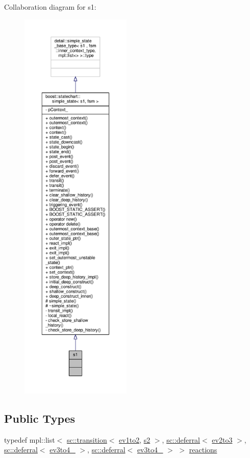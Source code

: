 Collaboration diagram for s1\+:
\nopagebreak
\begin{figure}[H]
\begin{center}
\leavevmode
\includegraphics[height=550pt]{structs1__coll__graph}
\end{center}
\end{figure}
\subsection*{Public Types}
\begin{DoxyCompactItemize}
\item 
typedef mpl\+::list$<$ \mbox{\hyperlink{classboost_1_1statechart_1_1transition}{sc\+::transition}}$<$ \mbox{\hyperlink{structev1to2}{ev1to2}}, \mbox{\hyperlink{structs2}{s2}} $>$, \mbox{\hyperlink{classboost_1_1statechart_1_1deferral}{sc\+::deferral}}$<$ \mbox{\hyperlink{structev2to3}{ev2to3}} $>$, \mbox{\hyperlink{classboost_1_1statechart_1_1deferral}{sc\+::deferral}}$<$ \mbox{\hyperlink{structev3to4__1}{ev3to4\+\_}} $>$, \mbox{\hyperlink{classboost_1_1statechart_1_1deferral}{sc\+::deferral}}$<$ \mbox{\hyperlink{structev3to4__2}{ev3to4\+\_}} $>$ $>$ \mbox{\hyperlink{structs1_aab00d2901c9b72bb435f9c0f569ee0f5}{reactions}}
\end{DoxyCompactItemize}
